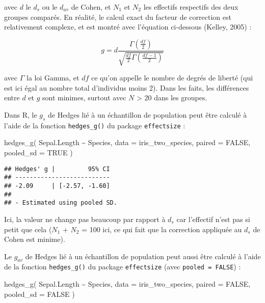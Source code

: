 \documentclass[
]{book}
\newenvironment{Shaded}{\begin{snugshade}}{\end{snugshade}}
\newcommand{\AttributeTok}[1]{\textcolor[rgb]{0.77,0.63,0.00}{#1}}
\newcommand{\ConstantTok}[1]{\textcolor[rgb]{0.00,0.00,0.00}{#1}}
\newcommand{\FunctionTok}[1]{\textcolor[rgb]{0.00,0.00,0.00}{#1}}
\newcommand{\NormalTok}[1]{#1}
\newcommand{\SpecialCharTok}[1]{\textcolor[rgb]{0.00,0.00,0.00}{#1}}
\begin{document}
avec \(d\) le \(d_s\) ou le \(d_{av}\) de Cohen, et \(N_{1}\) et \(N_{2}\) les effectifs respectifs des deux groupes comparés. En réalité, le calcul exact du facteur de correction est relativement complexe, et est montré avec l'équation ci-dessous (Kelley, 2005) :

\[g =  d \frac{\Gamma(\frac{df}{2})}{\sqrt{\frac{df}{2}\Gamma(\frac{df-1}{2})}} \]

avec \(\Gamma\) la loi Gamma, et \(df\) ce qu'on appelle le nombre de degrés de liberté (qui est ici égal au nombre total d'individus moins 2). Dans les faits, les différences entre \(d\) et \(g\) sont minimes, surtout avec \(N\) \textgreater{} 20 dans les groupes.

Dans R, le \(g_{s}\) de Hedges lié à un échantillon de population peut être calculé à l'aide de la fonction \texttt{hedges\_g()} du package \texttt{effectsize} :

\begin{Shaded}
\begin{Highlighting}[]
\FunctionTok{hedges\_g}\NormalTok{(}
\NormalTok{  Sepal.Length }\SpecialCharTok{\textasciitilde{}}\NormalTok{ Species,}
  \AttributeTok{data =}\NormalTok{ iris\_two\_species, }
  \AttributeTok{paired =} \ConstantTok{FALSE}\NormalTok{, }
  \AttributeTok{pooled\_sd =} \ConstantTok{TRUE}
\NormalTok{  )}
\end{Highlighting}
\end{Shaded}

\begin{verbatim}
## Hedges' g |         95% CI
## --------------------------
## -2.09     | [-2.57, -1.60]
## 
## - Estimated using pooled SD.
\end{verbatim}

Ici, la valeur ne change pas beaucoup par rapport à \(d_s\) car l'effectif n'est pas si petit que cela (\(N_{1}\) + \(N_{2}\) = 100 ici, ce qui fait que la correction appliquée au \(d_{s}\) de Cohen est minime).

Le \(g_{av}\) de Hedges lié à un échantillon de population peut aussi être calculé à l'aide de la fonction \texttt{hedges\_g()} du package \texttt{effectsize} (avec \texttt{pooled\ =\ FALSE}) :

\begin{Shaded}
\begin{Highlighting}[]
\FunctionTok{hedges\_g}\NormalTok{(}
\NormalTok{  Sepal.Length }\SpecialCharTok{\textasciitilde{}}\NormalTok{ Species,}
  \AttributeTok{data =}\NormalTok{ iris\_two\_species, }
  \AttributeTok{paired =} \ConstantTok{FALSE}\NormalTok{, }
  \AttributeTok{pooled\_sd =} \ConstantTok{FALSE}
\NormalTok{  )}
\end{Highlighting}
\end{Shaded}
\end{document}
